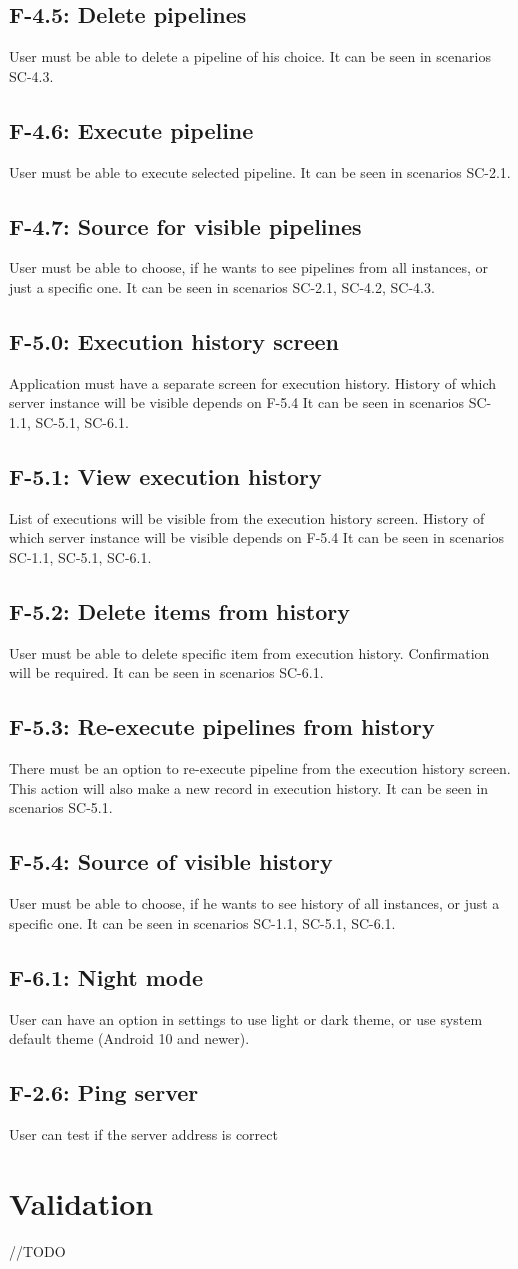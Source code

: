 \subsection*{F-4.5: Delete pipelines}
User must be able to delete a pipeline of his choice. It can be seen in scenarios SC-4.3.
\subsection*{F-4.6: Execute pipeline}
User must be able to execute selected pipeline. It can be seen in scenarios SC-2.1.
\subsection*{F-4.7: Source for visible pipelines}
User must be able to choose, if he wants to see pipelines from all instances, or just a specific one. It can be seen in scenarios SC-2.1, SC-4.2, SC-4.3.
\subsection*{F-5.0: Execution history screen}
Application must have a separate screen for execution history. History of which server instance will be visible depends on F-5.4 It can be seen in scenarios SC-1.1, SC-5.1, SC-6.1.
\subsection*{F-5.1: View execution history}
List of executions will be visible from the execution history screen. History of which server instance will be visible depends on F-5.4 It can be seen in scenarios SC-1.1, SC-5.1, SC-6.1.
\subsection*{F-5.2: Delete items from history}
User must be able to delete specific item from execution history. Confirmation will be required. It can be seen in scenarios SC-6.1.
\subsection*{F-5.3: Re-execute pipelines from history}
There must be an option to re-execute pipeline from the execution history screen. This action will also make a new record in execution history. It can be seen in scenarios SC-5.1.
\subsection*{F-5.4: Source of visible history}
User must be able to choose, if he wants to see history of all instances, or just a specific one. It can be seen in scenarios SC-1.1, SC-5.1, SC-6.1.
\subsection*{F-6.1: Night mode}
User can have an option in settings to use light or dark theme, or use system default theme (Android 10 and newer).
\subsection*{F-2.6: Ping server}
User can test if the server address is correct

\section{Validation}
//TODO